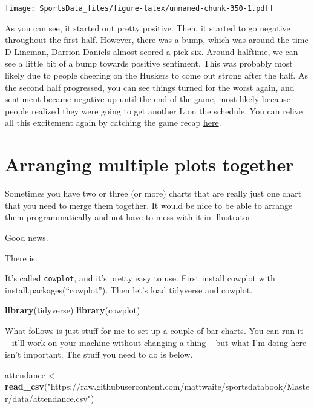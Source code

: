 \documentclass[
]{book}
\newenvironment{Shaded}{\begin{snugshade}}{\end{snugshade}}
\newcommand{\KeywordTok}[1]{\textcolor[rgb]{0.13,0.29,0.53}{\textbf{#1}}}
\newcommand{\NormalTok}[1]{#1}
\newcommand{\StringTok}[1]{\textcolor[rgb]{0.31,0.60,0.02}{#1}}
\begin{document}
\texttt{[image: SportsData\_files/figure-latex/unnamed-chunk-350-1.pdf]}

As you can see, it started out pretty positive. Then, it started to go negative throughout the first half. However, there was a bump, which was around the time D-Lineman, Darrion Daniels almost scored a pick six. Around halftime, we can see a little bit of a bump towards positive sentiment. This was probably most likely due to people cheering on the Huskers to come out strong after the half. As the second half progressed, you can see things turned for the worst again, and sentiment became negative up until the end of the game, most likely because people realized they were going to get another L on the schedule. You can relive all this excitement again by catching the game recap \href{https://www.youtube.com/watch?v=m0hKH6Zb0vY\&feature=onebox}{here}.

\hypertarget{arranging-multiple-plots-together}{%
\chapter{Arranging multiple plots together}\label{arranging-multiple-plots-together}}

Sometimes you have two or three (or more) charts that are really just one chart that you need to merge them together. It would be nice to be able to arrange them programmatically and not have to mess with it in illustrator.

Good news.

There is.

It's called \texttt{cowplot}, and it's pretty easy to use. First install cowplot with install.packages(``cowplot''). Then let's load tidyverse and cowplot.

\begin{Shaded}
\begin{Highlighting}[]
\KeywordTok{library}\NormalTok{(tidyverse)}
\KeywordTok{library}\NormalTok{(cowplot)}
\end{Highlighting}
\end{Shaded}

What follows is just stuff for me to set up a couple of bar charts. You can run it -- it'll work on your machine without changing a thing -- but what I'm doing here isn't important. The stuff you need to do is below.

\begin{Shaded}
\begin{Highlighting}[]
\NormalTok{attendance <-}\StringTok{ }\KeywordTok{read_csv}\NormalTok{(}\StringTok{"https://raw.githubusercontent.com/mattwaite/sportsdatabook/Master/data/attendance.csv"}\NormalTok{)}
\end{Highlighting}
\end{Shaded}
\end{document}
